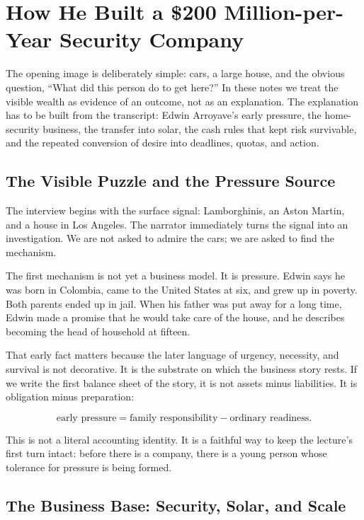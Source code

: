 \chapter{How He Built a \$200 Million-per-Year Security Company}

The opening image is deliberately simple: cars, a large house, and the obvious question, ``What did this person do to get here?'' In these notes we treat the visible wealth as evidence of an outcome, not as an explanation. The explanation has to be built from the transcript: Edwin Arroyave's early pressure, the home-security business, the transfer into solar, the cash rules that kept risk survivable, and the repeated conversion of desire into deadlines, quotas, and action.

\section{The Visible Puzzle and the Pressure Source}

The interview begins with the surface signal: Lamborghinis, an Aston Martin, and a house in Los Angeles. The narrator immediately turns the signal into an investigation. We are not asked to admire the cars; we are asked to find the mechanism.

The first mechanism is not yet a business model. It is pressure. Edwin says he was born in Colombia, came to the United States at six, and grew up in poverty. Both parents ended up in jail. When his father was put away for a long time, Edwin made a promise that he would take care of the house, and he describes becoming the head of household at fifteen.

That early fact matters because the later language of urgency, necessity, and survival is not decorative. It is the substrate on which the business story rests. If we write the first balance sheet of the story, it is not assets minus liabilities. It is obligation minus preparation:

\begin{equation}
\text{early pressure}
=
\text{family responsibility}
-
\text{ordinary readiness}.
\end{equation}

This is not a literal accounting identity. It is a faithful way to keep the lecture's first turn intact: before there is a company, there is a young person whose tolerance for pressure is being formed.

\section{The Business Base: Security, Solar, and Scale}

